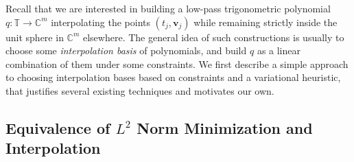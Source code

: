 \documentclass[11pt]{article}
\newcommand{\TT}{\mathbb{T}}
\newcommand{\CC}{\mathbb{C}}
\newcommand{\bv}{\bm v}
\begin{document}
Recall that we are interested in building a low-pass trigonometric polynomial $q: \TT \to \CC^m$ interpolating the points $(t_j, \bv_j)$ while remaining strictly inside the unit sphere in $\CC^m$ elsewhere.
The general idea of such constructions is usually to choose some \emph{interpolation basis} of polynomials, and build $q$ as a linear combination of them under some constraints.
We first describe a simple approach to choosing interpolation bases based on constraints and a variational heuristic, that justifies several existing techniques and motivates our own.

\subsection{Equivalence of $L^2$ Norm Minimization and Interpolation}
\end{document}
